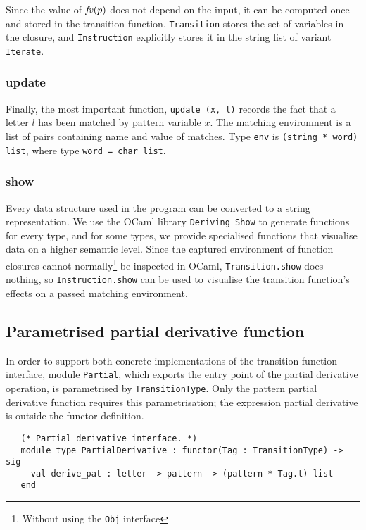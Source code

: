 Since the value of $\mathit{fv}(p)$ does not depend on the input, it can be computed
once and stored in the transition function. \texttt{Transition} stores the set
of variables in the closure, and \texttt{Instruction} explicitly stores it in
the string list of variant \texttt{Iterate}.


\subsubsection{update}

Finally, the most important function, \texttt{update (x, l)} records the fact
that a letter $l$ has been matched by pattern variable $x$. The matching
environment is a list of pairs containing name and value of matches. Type
\texttt{env} is \texttt{(string * word) list}, where type \texttt{word = char
list}.


\subsubsection{show}

Every data structure used in the program can be converted to a string
representation. We use the OCaml library \texttt{Deriving\_Show} to generate
functions for every type, and for some types, we provide specialised functions
that visualise data on a higher semantic level. Since the captured environment
of function closures cannot normally\footnote{Without using the \texttt{Obj}
interface} be inspected in OCaml, \texttt{Transition.show} does nothing, so
\texttt{Instruction.show} can be used to visualise the transition function's
effects on a passed matching environment.


\subsection{Parametrised partial derivative function}

In order to support both concrete implementations of the transition function
interface, module \texttt{Partial}, which exports the entry point of the partial
derivative operation, is parametrised by \texttt{TransitionType}. Only the
pattern partial derivative function requires this parametrisation; the
expression partial derivative is outside the functor definition.

\begin{lstlisting}
   (* Partial derivative interface. *)
   module type PartialDerivative : functor(Tag : TransitionType) -> sig
     val derive_pat : letter -> pattern -> (pattern * Tag.t) list
   end
\end{lstlisting}


